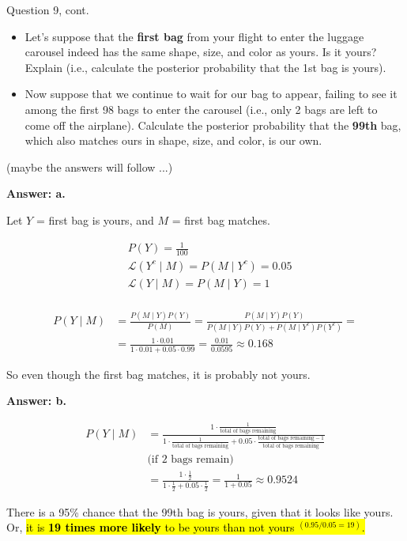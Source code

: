 \documentclass[12pt]{beamer}
\begin{document}
{%
\begin{frame}{}
\begin{block}{Question 9, cont.}
\begin{itemize}
\item[a.] Let's suppose that the \textbf{first bag} from your flight to enter the luggage carousel indeed has the same shape, size, and color as yours.
  Is it yours? Explain (i.e., calculate the posterior probability that the 1st bag is yours).
\vspace{0.4cm}
\item[b.] Now suppose that we continue to wait for our bag to appear, failing to see it among the first 98 bags to enter the carousel (i.e., only 2 bags are left to come off the airplane).
  Calculate the posterior probability that the \textbf{99th} bag, which also matches ours in shape, size, and color, is our own.
\end{itemize}
\vspace{0.4cm}
\small \alert{(maybe the answers will follow ...)}
\end{block}
\end{frame}

\begin{frame}{}
\textbf{Answer: a.}
{\color{blue}
\footnotesize
Let \(Y\) = first bag is yours, and \(M\) = first bag matches.

\[
\begin{aligned}
&P(Y)=\frac{1}{100}\\
&\mathcal{L}(Y^c\mid M)=P(M\mid Y^c)=0.05\\
&\mathcal{L}(Y\mid M)=P(M\mid Y)=1\\
\end{aligned}
\]

\[
\begin{aligned}
P(Y\mid M)&=\frac{P(M\mid Y)P(Y)}{P(M)}
  =\frac{P(M\mid Y)P(Y)}
         {P(M\mid Y)P(Y)+P(M\mid Y^c)P(Y^c)}=\\
&=\frac{1\cdot 0.01}{1\cdot 0.01+0.05\cdot 0.99}
=\frac{0.01}{0.0595}\approx 0.168
\end{aligned}
\]

So even though the first bag matches, it is probably not yours.
}
\end{frame}

\begin{frame}{}
\textbf{Answer: b.}
{\color{blue}
\footnotesize
\[
\begin{aligned}
P(Y\mid M)
&=\frac{1\cdot \tfrac{1}{\text{total of bags remaining}}}
{1\cdot \tfrac{1}{\text{total of bags remaining}} + 0.05\cdot \tfrac{\text{total of bags remaining} - 1}{\text{total of bags remaining}}}\\
&\text{(if 2 bags remain)}\\
&=\frac{1\cdot \tfrac{1}{2}}
{1\cdot \tfrac{1}{2} + 0.05\cdot \tfrac{1}{2}}=\frac{1}{1+0.05} \approx 0.9524
\end{aligned}
\]

There is a 95\% chance that the 99th bag is yours, given that it looks like yours.\\
Or, \hl{it is \textbf{19 times more likely} to be yours than not yours $^{(0.95/0.05 = 19)}$.}
}
\end{frame}
}

\end{document}
